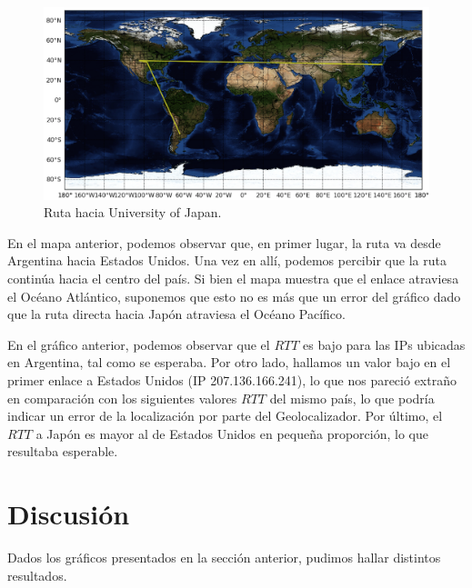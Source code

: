 \documentclass[10pt, a4paper]{article}
\begin{document}
\begin{figure}[H] %
\begin{center}
\includegraphics[width=400pt]{../imgs/map-iuj.png}
\caption{Ruta hacia University of Japan.}
\end{center}
\end{figure}

En el mapa anterior, podemos observar que, en primer lugar, la ruta va desde Argentina hacia Estados Unidos. Una vez en allí, podemos percibir que la ruta continúa hacia el centro del país. Si bien el mapa muestra que el enlace atraviesa el Océano Atlántico, suponemos que esto no es más que un error del gráfico dado que la ruta directa hacia Japón atraviesa el Océano Pacífico.




En el gráfico anterior, podemos observar que el $RTT$ es bajo para las IPs ubicadas en Argentina, tal como se esperaba. Por otro lado, hallamos un valor bajo en el primer enlace a Estados Unidos (IP 207.136.166.241), lo que nos pareció extraño en comparación con los siguientes valores $RTT$ del mismo país, lo que podría indicar un error de la localización por parte del Geolocalizador. Por último, el $RTT$ a Japón es mayor al de Estados Unidos en pequeña proporción, lo que resultaba esperable.


\newpage
\section{Discusión}
Dados los gráficos presentados en la sección anterior, pudimos hallar distintos resultados. 
\end{document}
